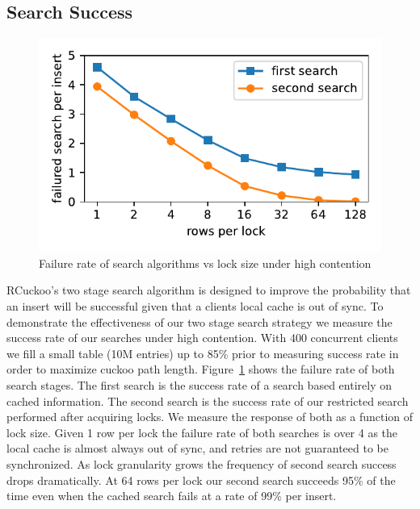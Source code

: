 
\subsection{Search Success}
\label{sec:search_success}
\begin{figure}[ht]
    \includegraphics[width=0.99\linewidth]{fig/search_success_lock_size.pdf}
    \caption{Failure rate of search algorithms vs lock size under high contention}
    \label{fig:search_success}
\end{figure}

RCuckoo's two stage search algorithm is designed to improve
the probability that an insert will be successful given that
a clients local cache is out of sync. To demonstrate the
effectiveness of our two stage search strategy we measure
the success rate of our searches under high contention. With
400 concurrent clients we fill a small table (10M entries)
up to 85\% prior to measuring success rate in order to
maximize cuckoo path length. Figure~\ref{fig:search_success}
shows the failure rate of both search stages. The first
search is the success rate of a search based entirely on
cached information. The second search is the success rate of
our restricted search performed after acquiring locks. We
measure the response of both as a function of lock size.
Given 1 row per lock the failure rate of both searches is
over 4 as the local cache is almost always out of sync, and
retries are not guaranteed to be synchronized. As lock
granularity grows the frequency of second search success
drops dramatically. At 64 rows per lock our second search
succeeds 95\% of the time even when the cached search fails
at a rate of 99\% per insert.



